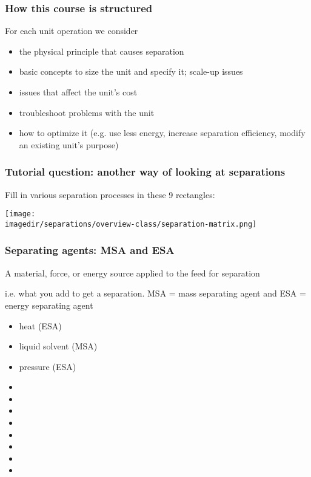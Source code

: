 \begin{frame}\frametitle{How this course is structured}
	For each unit operation we consider
	\begin{itemize}
		\item	the physical principle that causes separation
		\item	basic concepts to size the unit and specify it; scale-up issues
		\item	issues that affect the unit's cost
		\item	troubleshoot problems with the unit
		\item	how to optimize it (e.g. use less energy, increase separation efficiency, modify an existing unit's purpose)
	\end{itemize}
\end{frame}

\begin{frame}\frametitle{Tutorial question: another way of looking at separations}
	Fill in various separation processes in these 9 rectangles:
	\begin{center}
		\texttt{[image: \\imagedir/separations/overview-class/separation-matrix.png]}
	\end{center}
\end{frame}

\begin{frame}\frametitle{{\color{purple} Separating agents}: MSA and ESA}
	\begin{exampleblock}
		{\small A material, force, or energy source applied to the feed for separation }
	\end{exampleblock}
	\vspace{6pt}
	i.e. what you add to get a separation. {\color{purple}MSA} = mass separating agent and {\color{purple}ESA} = energy separating agent
	\vspace{6pt}
	\begin{itemize}
		\item	heat (ESA)
		\item	liquid solvent (MSA)
		\item	pressure (ESA)
		\item	\pause\iftoggle{instructor}{vacuum}{}
		\item	\iftoggle{instructor}{membrane}{}
		\item	\iftoggle{instructor}{filter media}{}
		\item	\iftoggle{instructor}{electric field}{}
		\item	\iftoggle{instructor}{temperature gradient}{}
		\item	\iftoggle{instructor}{gravitational field (natural, or artificially created)}{}
		\item	\iftoggle{instructor}{adsorbent}{}
		\item	\iftoggle{instructor}{absorbent}{}
	\end{itemize}
\end{frame}

